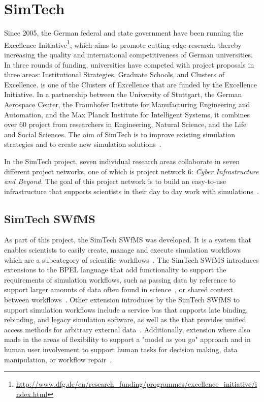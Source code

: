 \section{SimTech}
\label{fundamentals:simtech}

Since 2005, the German federal and state government have been running the Excellence Initiative\footnote{\url{http://www.dfg.de/en/research_funding/programmes/excellence_initiative/index.html}}, which aims to promote cutting-edge research, thereby increasing the quality and international competitiveness of German universities.
In three rounds of funding, universities have competed with project proposals in three areas: Institutional Strategies, Graduate Schools, and Clusters of Excellence.
 is one of the Clusters of Excellence that are funded by the Excellence Initiative.
In a partnership between the University of Stuttgart, the German Aerospace Center, the Fraunhofer Institute for Manufacturing Engineering and Automation, and the Max Planck Institute for Intelligent Systems, it combines over 60 project from researchers in Engineering, Natural Science, and the Life and Social Sciences.
The aim of SimTech is to improve existing simulation strategies and to create new simulation solutions~\autocite{excellence:glance}.

In the SimTech project, seven individual research areas collaborate in seven different project networks, one of which is project network 6: \textit{Cyber Infrastructure and Beyond}.
The goal of this project network is to build an easy-to-use infrastructure that supports scientists in their day to day work with simulations~\autocite{simtech:projectnetwork6}.

\subsection{SimTech SWfMS}

As part of this project, the SimTech SWfMS was developed.
It is a system that enables scientists to easily create, manage and execute simulation workflows which are a subcategory of scientific workflows~\autocite{workflow:simulation:flexibility}.
The SimTech SWfMS introduces extensions to the BPEL language that add functionality to support the requirements of simulation workflows, such as passing data by reference to support larger amounts of data often found in science~\autocite[also~see][]{workflow:simulation:modelling:datareferences}, or shared context between workflows~\autocite{workflow:simulation:modelling}.
Other extension introduces by the SimTech SWfMS to support simulation workflows include a service bus that supports late binding, rebinding, and legacy simulation software, as well as the  that provides unified access methods for arbitrary external data~\autocite{workflow:simulation:runtime}.
Additionally, extension where also made in the areas of flexibility to support a "model as you go" approach and in human user involvement to support human tasks for decision making, data manipulation, or workflow repair~\autocites{workflow:simulation:flexibility}{workflow:simulation:humanusers}.

